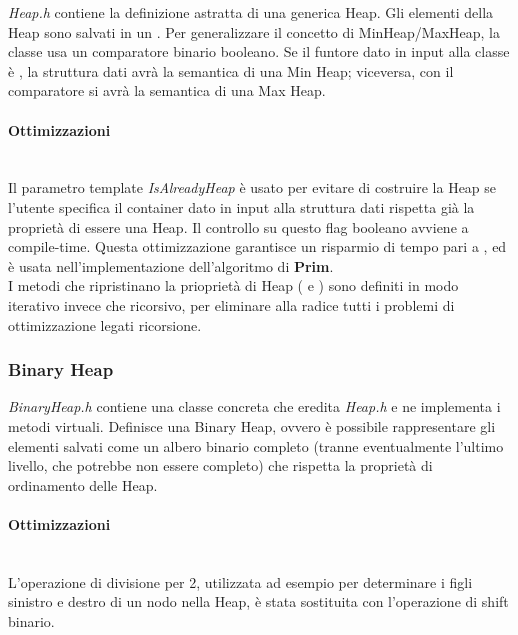 \textit{Heap.h} contiene la definizione astratta di una generica Heap.
Gli elementi della Heap sono salvati in un .
Per generalizzare il concetto di MinHeap/MaxHeap, la classe usa un comparatore binario booleano. Se il funtore dato in input alla classe è
, la struttura dati avrà la semantica di una Min Heap; viceversa, con il comparatore  si avrà la semantica di una Max Heap.

\paragraph{Ottimizzazioni}\mbox{} \\

\noindent Il parametro template \textit{IsAlreadyHeap} è usato per evitare di costruire la Heap se l'utente specifica il container dato in input alla struttura dati rispetta già la proprietà di essere una Heap. Il controllo su questo flag booleano avviene a compile-time. Questa ottimizzazione garantisce un risparmio di tempo pari a \complexityN{}, ed è usata nell'implementazione dell'algoritmo di \textbf{Prim}. \\

\noindent I metodi che ripristinano la prioprietà di Heap ( e ) sono definiti in modo iterativo invece che ricorsivo, per eliminare alla radice tutti i problemi di ottimizzazione legati ricorsione.

\subsubsection{Binary Heap}

\textit{BinaryHeap.h} contiene una classe concreta che eredita \textit{Heap.h} e ne implementa i metodi virtuali. Definisce una Binary Heap, ovvero è possibile rappresentare gli elementi salvati come un albero binario completo (tranne eventualmente l'ultimo livello, che potrebbe non essere completo) che rispetta la proprietà di ordinamento delle Heap.

\paragraph{Ottimizzazioni}\mbox{} \\

\noindent L'operazione di divisione per 2, utilizzata ad esempio per determinare i figli sinistro e destro di un nodo nella Heap, è stata sostituita con l'operazione di shift binario.


